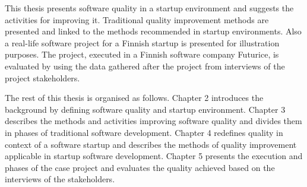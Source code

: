 
This thesis presents software quality in a startup environment and suggests the activities for improving it. Traditional quality improvement methods are presented and linked to the methods recommended in startup environments. Also a real-life software project for a Finnish startup is presented for illustration purposes. The project, executed in a Finnish software company Futurice, is evaluated by using the data gathered after the project from interviews of the project stakeholders.


The rest of this thesis is organised as follows. Chapter 2 introduces the background by defining software quality and startup environment. Chapter 3 describes the methods and activities improving software quality and divides them in phases of traditional software development. Chapter 4 redefines quality in context of a software startup and describes the methods of quality improvement applicable in startup software development. Chapter 5 presents the execution and phases of the case project and evaluates the quality achieved based on the interviews of the stakeholders.
